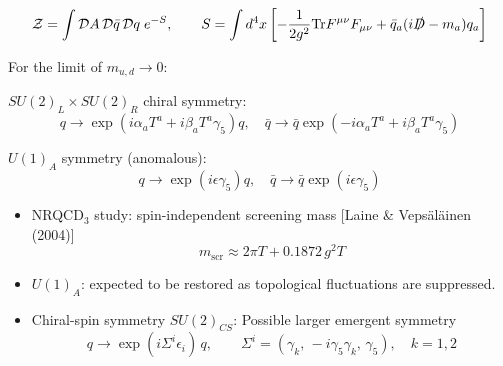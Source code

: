 \documentclass[10pt, aspectratio=169]{beamer} %
\begin{document}
\begin{frame}
\vfill
\[
\mathcal{Z} = \int \mathcal{D} A\, \mathcal{D}\bar{q}\, \mathcal{D}q\; e^{-S}, \qquad
S = \int d^4x \left[ - \frac{1}{2g^2} \mathrm{Tr} F^{\mu\nu} F_{\mu\nu}
+ \bar q_a (i \slashed{D} - m_a) q_a \right]
\]
\vspace{0.8em}

For the limit of $m_{u,d} \to 0$:

\vspace{0.4em}
$SU(2)_L \times SU(2)_R$ chiral symmetry:
\[
    q \to \exp(i\alpha_a T^a + i\beta_a T^a \gamma_5)q, \quad \bar{q} \to \bar{q} \exp(-i\alpha_a T^a + i\beta_a T^a \gamma_5)
\]

$U(1)_A$ symmetry (anomalous):
\[
    q \to \exp(i\epsilon\gamma_5)q, \quad \bar{q} \to \bar{q} \exp(i\epsilon\gamma_5)
\]

\vfill
\end{frame}

\begin{frame}
\fontsize{10.5pt}{14pt}\selectfont
\vfill

\begin{itemize}
\setlength{\itemsep}{0.8em}
\item NRQCD$_3$ study: spin-independent screening mass {\scriptsize [Laine \& Vepsäläinen (2004)]}
\[ m_{\mathrm{scr}} \approx 2\pi T + 0.1872\, g^2 T \]
\item $U(1)_A$: expected to be restored as topological fluctuations are suppressed.
\item Chiral-spin symmetry $SU(2)_{CS}$: Possible larger emergent symmetry
    \[
    q \to \exp(i\Sigma^i\epsilon_i)\,q, \qquad \Sigma^i = (\gamma_k,\, -i\gamma_5\gamma_k,\, \gamma_5), \quad k = 1, 2
\]
\end{itemize}
\vfill
\end{frame}
\end{document}
